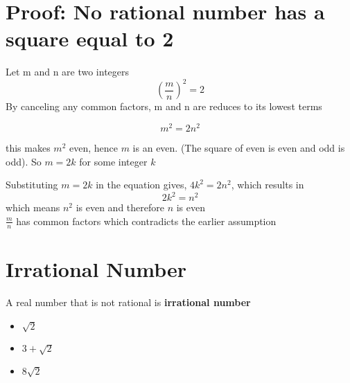 \section{Proof: No rational number has a square equal to 2}
Let m and n are two integers
\[
    \left( \frac{m}{n} \right)^{2} = 2  
\]
By canceling any common factors, m and n are reduces to its lowest terms 

\[
    m^{2} = 2n^{2}
\]

this makes \(m^{2}\) even, hence \(m\) is an even. (The square of even is even and odd is odd). So \(m = 2k\) for some integer \(k\)

Substituting \(m = 2k\) in the equation gives, \(4k^{2} = 2n^{2} \), which results in 
\[
    2k^{2} = n^{2}
\]
which means \( n^{2}\) is even and therefore \(n \) is even
\\
\(\frac{m}{n} \) has common factors which contradicts the earlier assumption

\section{Irrational Number}

\begin{tcolorbox}[colback=yellow!5,
colframe=orange!80!black,
title=Irrational Number]
A real number that is not rational is \textbf{irrational number}
\end{tcolorbox}
\begin{itemize}
    \item \( \sqrt{2}\)
    \item \(3+\sqrt{2}\)
    \item \(8\sqrt{2}\)
\end{itemize}